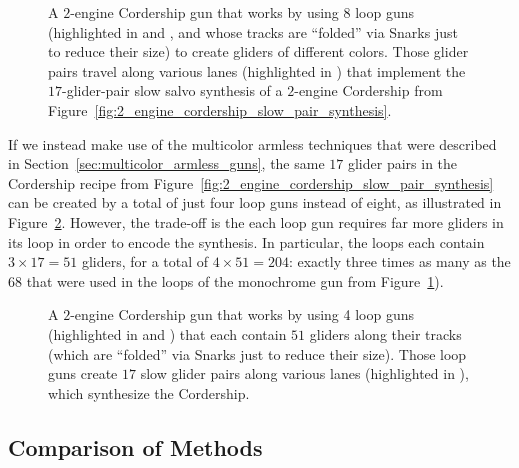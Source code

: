 \begin{figure}[!htb]
	\centering
	\caption{A $2$-engine Cordership gun that works by using 8 loop guns (highlighted in  and , and whose tracks are ``folded'' via Snarks just to reduce their size) to create gliders of different colors. Those glider pairs travel along various lanes (highlighted in ) that implement the $17$-glider-pair slow salvo synthesis of a $2$-engine Cordership from Figure~\ref{fig:2_engine_cordership_slow_pair_synthesis}.}\label{fig:armless_monochrome_cordership_gun}
\end{figure}

If we instead make use of the multicolor armless techniques that were described in Section~\ref{sec:multicolor_armless_guns}, the same $17$ glider pairs in the Cordership recipe from Figure~\ref{fig:2_engine_cordership_slow_pair_synthesis} can be created by a total of just four loop guns instead of eight, as illustrated in Figure~\ref{fig:armless_cordership_gun}. However, the trade-off is the each loop gun requires far more gliders in its loop in order to encode the synthesis. In particular, the loops each contain $3 \times 17 = 51$ gliders, for a total of $4 \times 51 = 204$: exactly three times as many as the $68$ that were used in the loops of the monochrome gun from Figure~\ref{fig:armless_monochrome_cordership_gun}).


\begin{figure}[!htb]
	\centering
	\caption{A $2$-engine Cordership gun that works by using 4 loop guns (highlighted in  and ) that each contain $51$ gliders along their tracks (which are ``folded'' via Snarks just to reduce their size). Those loop guns create $17$ slow glider pairs along various lanes (highlighted in ), which synthesize the Cordership.}\label{fig:armless_cordership_gun}
\end{figure}


\subsection{Comparison of Methods}\label{sec:method_compare}

